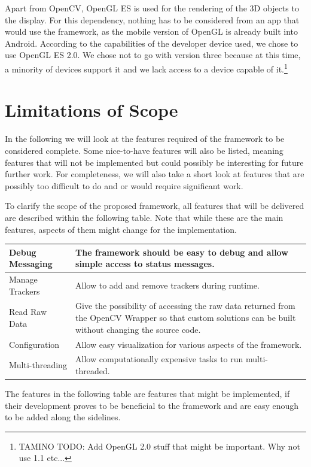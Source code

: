 Apart from OpenCV, OpenGL ES is used for the rendering of the 3D objects to the display.
For this dependency, nothing has to be considered from an app that would use the framework, as the mobile version of OpenGL is already built into Android.
According to the capabilities of the developer device used, we chose to use OpenGL ES 2.0.
We chose not to go with version three because at this time, a minority of devices support it and we lack access to a device capable of it.\footnote{TAMINO TODO: Add OpenGL 2.0 stuff that might be important. Why not use 1.1 etc...}

\section{Limitations of Scope}

In the following we will look at the features required of the framework to be considered complete.
Some nice-to-have features will also be listed, meaning features that will not be implemented but could possibly be interesting for future further work.
For completeness, we will also take a short look at features that are possibly too difficult to do and or would require significant work.

To clarify the scope of the proposed framework, all features that will be delivered are described within the following table.
Note that while these are the main features, aspects of them might change for the implementation.

\begin{tabulary}{\textwidth}{L || L}
Debug Messaging & The framework should be easy to debug and allow simple access to status messages.\\
\hline
Manage Trackers & Allow to add and remove trackers during runtime.\\
\hline
Read Raw Data & Give the possibility of accessing the raw data returned from the OpenCV Wrapper so that custom solutions can be built without changing the source code.\\
\hline
Configuration & Allow easy visualization for various aspects of the framework.\\
\hline
Multi-threading & Allow computationally expensive tasks to run multi-threaded.\\
\end{tabulary}

The features in the following table are features that might be implemented, if their development proves to be beneficial to the framework and are easy enough to be added along the sidelines.

